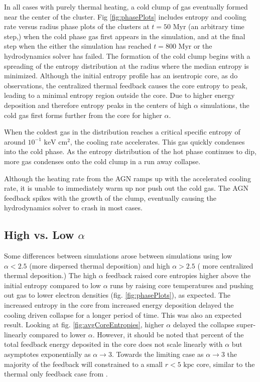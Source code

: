 \documentclass[iop,apjl, twocolappendix]{emulateapj}   %
\begin{document}
In all cases with purely thermal heating, a cold clump of gas eventually formed
near the center of the cluster. Fig \ref{fig:phasePlots} includes entropy and
cooling rate versus radius phase plots of the clusters at $t=50 \text{ Myr}$
(an arbitrary time step,) when the cold phase gas first appears in the
simulation, and at the final step when the either the simulation has reached
$t=800 \text{ Myr}$ or the hydrodynamics solver has failed. The formation of
the cold clump begins with a spreading of the entropy distribution at the
radius where the median entropy 
is minimized. Although the initial entropy profile has an isentropic core, as
do observations, the centralized thermal feedback causes the core entropy to
peak, leading to a minimal entropy region outside the core. Due to higher
energy deposition and therefore entropy peaks in the centers of high $\alpha$
simulations, the cold gas first forms further from the core for higher
$\alpha$.

When the coldest gas in the distribution reaches a critical specific entropy of
around $10^{-1} \text{ keV} \text{ cm}^2$, the cooling rate accelerates. This
gas quickly condenses into the cold phase. As the entropy distribution of the
hot phase continues to dip, more gas condenses onto the cold clump in a run
away collapse. 

Although the heating rate from the AGN ramps up with the accelerated cooling
rate, it is unable to immediately warm up nor push out the cold gas. The AGN
feedback spikes with the growth of the clump, eventually causing the
hydrodynamics solver to crash in most cases.

\subsection{High vs. Low $\alpha$}
\label{sec:high_vs_low_alpha}

Some differences between simulations arose between simulations using low
$\alpha<2.5$ (more dispersed thermal deposition) and high $\alpha>2.5$ ( more
centralized thermal deposition.) The high $\alpha$ feedback raised core
entropies higher above the initial entropy compared to low $\alpha$ runs by
raising core temperatures and pushing out gas to lower electron densities (fig.
\ref{fig:phasePlots}), as expected.  The increased entropy in the core from
increased energy deposition delayed the cooling driven collapse for a longer
period of time. This was also an expected result. Looking at fig.
\ref{fig:avgCoreEntropies}, higher $\alpha$ delayed the collapse super-linearly
compared to lower $\alpha$. However, it should be noted that percent of the
total feedback energy deposited in the core does not scale linearly with
$\alpha$ but asymptotes exponentially as $\alpha \rightarrow 3$.  Towards the
limiting case as $\alpha \rightarrow 3$ the majority of the feedback will
constrained to a small $r < 5 \text{ kpc}$ core, similar to the thermal only
feedback case from \cite{meece_triggering_2017}.
\end{document}
